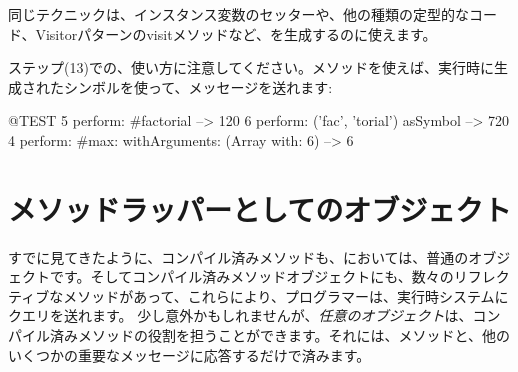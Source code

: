 \documentclass[a4paper,10pt,twoside]{book}
\begin{document}
同じテクニックは、インスタンス変数のセッターや、他の種類の定型的なコード、Visitorパターンのvisitメソッドなど、を生成するのに使えます。

ステップ(13)での、使い方に注意してください。メソッドを使えば、実行時に生成されたシンボルを使って、メッセージを送れます:
\begin{code}{@TEST}
5 perform: #factorial                                             --> 120
6 perform: ('fac', 'torial') asSymbol                       --> 720
4 perform: #max: withArguments: (Array with: 6) --> 6
\end{code}

\section{メソッドラッパーとしてのオブジェクト}

すでに見てきたように、コンパイル済みメソッドも、\st{}においては、普通のオブジェクトです。そしてコンパイル済みメソッドオブジェクトにも、数々のリフレクティブなメソッドがあって、これらにより、プログラマーは、実行時システムにクエリを送れます。
少し意外かもしれませんが、\emph{任意のオブジェクト}は、コンパイル済みメソッドの役割を担うことができます。それには、メソッドと、他のいくつかの重要なメッセージに応答するだけで済みます。%

\end{document}
